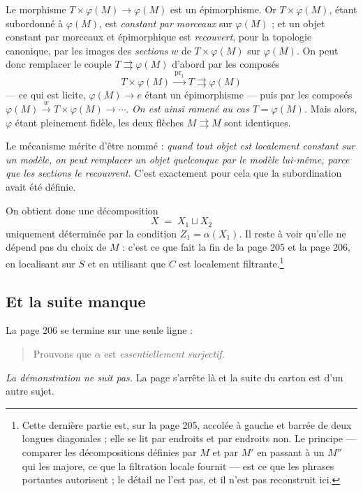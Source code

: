 \documentclass[11pt,a4paper]{article}
\begin{document}
Le morphisme $T \times \varphi(M) \to \varphi(M)$ est un épimorphisme. Or
$T \times \varphi(M)$, étant subordonné à $\varphi(M)$, est \emph{constant par
morceaux} sur $\varphi(M)$ ; et un objet constant par morceaux et épimorphique
est \emph{recouvert}, pour la topologie canonique, par les images des
\emph{sections} $w$ de $T \times \varphi(M)$ sur $\varphi(M)$. On peut donc
remplacer le couple $T \rightrightarrows \varphi(M)$ d'abord par les composés
\[
  T \times \varphi(M) \xrightarrow{\ \mathrm{pr}_{1}\ } T
  \rightrightarrows \varphi(M)
\]
--- ce qui est licite, $\varphi(M) \to e$ étant un épimorphisme --- puis par
les composés $\varphi(M) \xrightarrow{\ w\ } T \times \varphi(M) \to \cdots$.
\emph{On est ainsi ramené au cas $T = \varphi(M)$.} Mais alors, $\varphi$ étant
pleinement fidèle, les deux flèches $M \rightrightarrows M$ sont identiques.

Le mécanisme mérite d'être nommé : \emph{quand tout objet est localement
constant sur un modèle, on peut remplacer un objet quelconque par le modèle
lui-même, parce que les sections le recouvrent}. C'est exactement pour cela que
la subordination avait été définie.

On obtient donc une décomposition
\[
  X \;=\; X_{1} \sqcup X_{2}
\]
uniquement déterminée par la condition $Z_{1} = \alpha(X_{1})$. Il reste à voir
qu'elle ne dépend pas du choix de $M$ : c'est ce que fait la fin de la page 205
et la page 206, en localisant sur $S$ et en utilisant que $C$ est localement
filtrante.\footnote{Cette dernière partie est, sur la page 205, accolée à
gauche et barrée de deux longues diagonales ; elle se lit par endroits et par
endroits non. Le principe --- comparer les décompositions définies par $M$ et
par $M'$ en passant à un $M''$ qui les majore, ce que la filtration locale
fournit --- est ce que les phrases portantes autorisent ; le détail ne l'est
pas, et il n'est pas reconstruit ici.}

\subsection*{Et la suite manque}

La page 206 se termine sur une seule ligne :

\begin{quote}
Prouvons que $\alpha$ est \emph{essentiellement surjectif}.
\end{quote}

\emph{La démonstration ne suit pas.} La page s'arrête là et la suite du carton
est d'un autre sujet.
\end{document}
